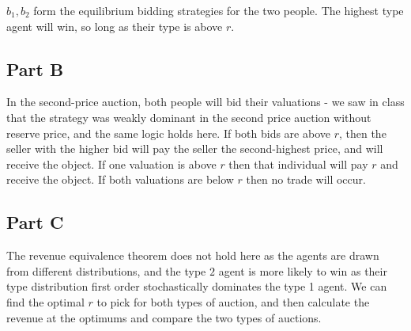 \documentclass[11pt]{article} %
\begin{document}
$b_1,b_2$ form the equilibrium bidding strategies for the two people. The highest type agent will win, so long as their type is above $r$.
\subsection{Part B}
In the second-price auction, both people will bid their valuations - we saw in class that the strategy was weakly dominant in the second price auction without reserve price, and the same logic holds here. If both bids are above $r$, then the seller with the higher bid will pay the seller the second-highest price, and will receive the object. If one valuation is above $r$ then that individual will pay $r$ and receive the object. If both valuations are below $r$ then no trade will occur.
\subsection{Part C}
The revenue equivalence theorem does not hold here as the agents are drawn from different distributions, and the type $2$ agent is more likely to win as their type distribution first order stochastically dominates the type 1 agent. We can find the optimal $r$ to pick for both types of auction, and then calculate the revenue at the optimums and compare the two types of auctions.
\end{document}

